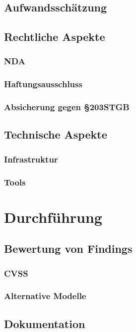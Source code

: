 \documentclass[11pt,DIV=11,twoside, openright, BCOR=3mm]{scrreprt} %
\begin{document}
		            \subsection{Aufwandsschätzung}
		            \subsection{Rechtliche Aspekte}
		            	\subsubsection{NDA}
		            	\subsubsection{Haftungsausschluss}
		            	\subsubsection{Absicherung gegen §203STGB}
		            \subsection{Technische Aspekte}
		            	\subsubsection{Infrastruktur}
		    			\subsubsection{Tools}
	            \section{Durchführung}
	            	\subsection{Bewertung von Findings}
	            		\subsubsection{CVSS}
	            		\subsubsection{Alternative Modelle}
					\subsection{Dokumentation}	            	
\end{document}
